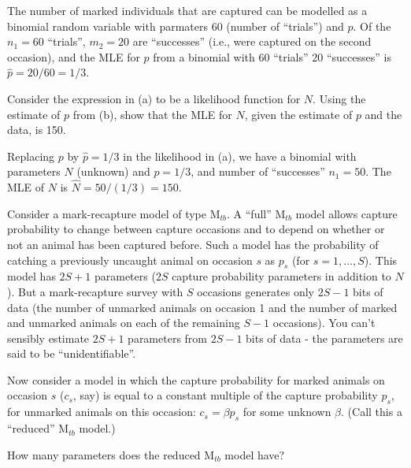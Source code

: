 \begin{questions}
\begin{parts}
{\begin{solution}
The number of marked individuals that are captured can be modelled as a binomial random variable with parmaters 60 (number of ``trials'') and $p$. Of the $n_1=60$ ``trials'', $m_2=20$ are ``successes'' (i.e., were captured on the second occasion), and the MLE for $p$ from a binomial with 60 ``trials'' 20 ``successes'' is $\hat{p}=20/60=1/3$.
\end{solution}}

\item Consider the expression in (a) to be a likelihood function for $N$. Using the estimate of $p$ from (b), show that the MLE for $N$, given the estimate of $p$ and the data, is 150.

{\begin{solution}
Replacing $p$ by $\hat{p}=1/3$ in the likelihood in (a), we have a binomial with parameters $N$ (unknown) and $p=1/3$, and number of ``successes'' $n_1=50$. The MLE of $N$ is $\hat{N}=50/(1/3)=150$.
\end{solution}}

\end{parts}


\item Consider a mark-recapture model of type M$_{tb}$. A ``full'' M$_{tb}$ model allows capture probability to change between capture occasions and to depend on whether or not an animal has been captured before. Such a model has the probability of catching a previously uncaught animal on occasion $s$ as $p_{s}$ (for $s=1,\ldots,S$). This model has $2S+1$ parameters ($2S$ capture probability parameters in addition to $N$). But a mark-recapture survey with $S$ occasions generates only $2S-1$ bits of data (the number of unmarked animals on occasion 1 and the number of marked and unmarked animals on each of the remaining $S-1$ occasions). You can't sensibly estimate $2S+1$ parameters from $2S-1$ bits of data - the parameters are said to be ``unidentifiable''.

Now consider a model in which the capture probability for marked animals on occasion $s$ ($c_s$, say) is equal to a constant multiple of the capture probability $p_s$, for unmarked animals on this occasion: $c_s=\beta p_s$ for some unknown $\beta$. (Call this a ``reduced'' M$_{tb}$ model.)

\begin{parts}

\item How many parameters does the reduced M$_{tb}$ model have? 


\end{parts}
\end{questions}
